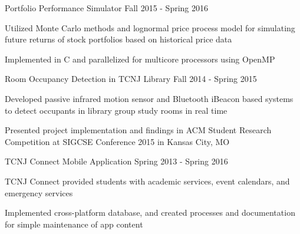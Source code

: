 

\begin{cventries}

  \bproject
    {Portfolio Performance Simulator} %
    {Fall 2015 - Spring 2016} %
    {
      \begin{cvitems} %
        \item {Utilized Monte Carlo methods and lognormal price process model for simulating future returns of stock portfolios based on historical price data}
        \item {Implemented in C and parallelized for multicore processors using OpenMP}
      \end{cvitems}
    }

  \bproject
    {Room Occupancy Detection in TCNJ Library} %
    {Fall 2014 - Spring 2015} %
    {
      \begin{cvitems} %
        \item {Developed passive infrared motion sensor and Bluetooth iBeacon based systems to detect occupants in library group study rooms in real time}
        \item {Presented project implementation and findings in ACM Student Research Competition at SIGCSE Conference 2015 in Kansas City, MO}
      \end{cvitems}
    }

  \bproject
    {TCNJ Connect Mobile Application} %
    {Spring 2013 - Spring 2016} %
    {
      \begin{cvitems} %
        \item {TCNJ Connect provided students with academic services, event calendars, and emergency services}
        \item {Implemented cross-platform database, and created processes and documentation for simple maintenance of app content}
      \end{cvitems}
    }

\end{cventries}
